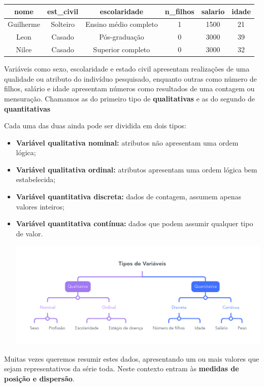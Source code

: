 \documentclass[
]{book}
\begin{document}
\begin{tabular}{c|c|c|c|c|c}
\hline
nome & est\_civil & escolaridade & n\_filhos & salario & idade\\
\hline
Guilherme & Solteiro & Ensino médio completo & 1 & 1500 & 21\\
\hline
Leon & Casado & Pós-graduação & 0 & 3000 & 39\\
\hline
Nilce & Casado & Superior completo & 0 & 3000 & 32\\
\hline
\end{tabular}

Variáveis como sexo, escolaridade e estado civil apresentam realizações de uma qualidade ou atributo do indivíduo pesquisado, enquanto outras como número de filhos, salário e idade apresentam números como resultados de uma contagem ou mensuração. Chamamos as do primeiro tipo de \textbf{qualitativas} e as do segundo de \textbf{quantitativas}

Cada uma das duas ainda pode ser dividida em dois tipos:

\begin{itemize}
\item
  \textbf{Variável qualitativa nominal:} atributos não apresentam uma ordem lógica;
\item
  \textbf{Variável qualitativa ordinal:} atributos apresentam uma ordem lógica bem estabelecida;
\item
  \textbf{Variável quantitativa discreta:} dados de contagem, assumem apenas valores inteiros;
\item
  \textbf{Variável quantitativa contínua:} dados que podem assumir qualquer tipo de valor.

  \includegraphics{figs/tipos_de_variaveis.png}
\end{itemize}

Muitas vezes queremos resumir estes dados, apresentando um ou mais valores que sejam representativos da série toda. Neste contexto entram às \textbf{medidas de posição e dispersão}.
\end{document}

